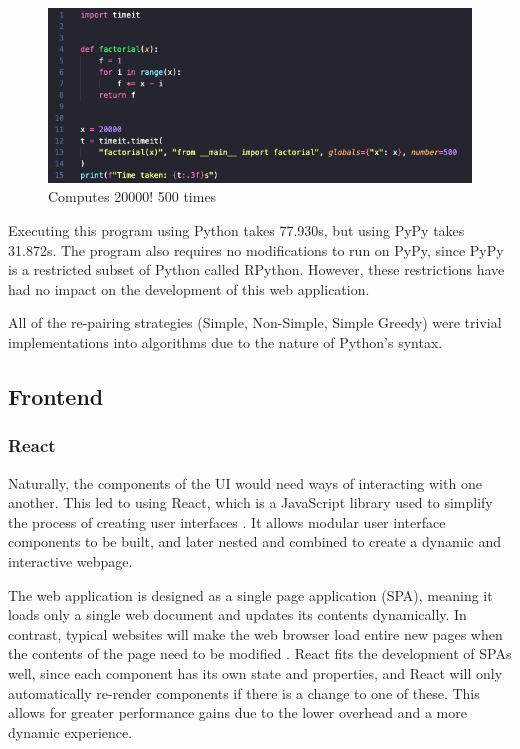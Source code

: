 \begin{figure}[H]
    \centering
    \includegraphics[scale=0.55]{./images/factorialPyPy.png}
    \caption{Computes 20000! 500 times}
\end{figure}

\noindent Executing this program using Python takes 77.930s, but using PyPy takes 31.872s. The program also requires no modifications to run on PyPy, since PyPy is a restricted subset of Python called RPython. However, these restrictions have had no impact on the development of this web application.

\par\null\par
\noindent All of the re-pairing strategies (Simple, Non-Simple, Simple Greedy) were trivial implementations into algorithms due to the nature of Python's syntax.


\subsection{Frontend}

\subsubsection{React}
\noindent Naturally, the components of the UI would need ways of interacting with one another. This led to using React, which is a JavaScript library used to simplify the process of creating user interfaces \cite{whatisReact}. It allows modular user interface components to be built, and later nested and combined to create a dynamic and interactive webpage. 

\par\null\par
\noindent The web application is designed as a single page application (SPA), meaning it loads only a single web document and updates its contents dynamically. In contrast, typical websites will make the web browser load entire new pages when the contents of the page need to be modified \cite{singlepageapp}. React fits the development of SPAs well, since each component has its own state and properties, and React will only automatically re-render components if there is a change to one of these.
This allows for greater performance gains due to the lower overhead and a more dynamic experience.


